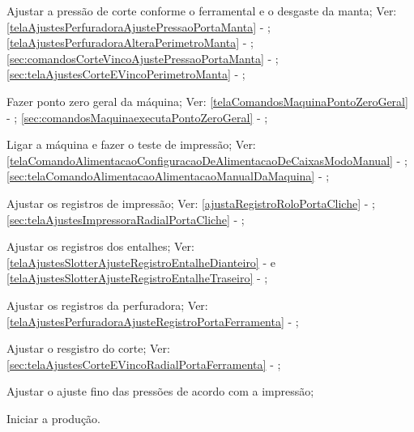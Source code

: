 \begin{procedureAdjustmentNoRecipe}
  \fi
  \item[\ding{\dingNumber}] Ajustar a pressão de corte conforme o ferramental e o desgaste da manta; Ver: 
  \ifmachineTypeFlexo
  \ref{telaAjustesPerfuradoraAjustePressaoPortaManta} - ;
  \ref{telaAjustesPerfuradoraAlteraPerimetroManta} - ;
  \fi
  \ifmachineTypeIcv
  \ref{sec:comandosCorteVincoAjustePressaoPortaManta} - ;
  \ref{sec:telaAjustesCorteEVincoPerimetroManta} - ;
  \fi
  \item[\ding{\dingNumber}] Fazer ponto zero geral da máquina; Ver: 
  \ifmachineTypeFlexo
  \ref{telaComandosMaquinaPontoZeroGeral} - ;
  \fi
  \ifmachineTypeIcv
  \ref{sec:comandosMaquinaexecutaPontoZeroGeral} - ;
  \fi
  \item[\ding{\dingNumber}] Ligar a máquina e fazer o teste de impressão; Ver: 
  \ifmachineTypeFlexo
  \ref{telaComandoAlimentacaoConfiguracaoDeAlimentacaoDeCaixasModoManual} - ;
  \fi
  \ifmachineTypeIcv
  \ref{sec:telaComandoAlimentacaoAlimentacaoManualDaMaquina} - ;
  \fi
  \item[\ding{\dingNumber}] Ajustar os registros de impressão; Ver: 
  \ifmachineTypeFlexo
  \ref{ajustaRegistroRoloPortaCliche} - ;
  \fi
  \ifmachineTypeIcv
  \ref{sec:telaAjustesImpressoraRadialPortaCliche} - ;
  \fi
  \ifmachineTypeFlexo
  \item[\ding{\dingNumber}] Ajustar os registros dos entalhes; Ver: \ref{telaAjustesSlotterAjusteRegistroEntalheDianteiro} -  e \ref{telaAjustesSlotterAjusteRegistroEntalheTraseiro} - ;
  \item[\ding{\dingNumber}] Ajustar os registros da perfuradora; Ver: \ref{telaAjustesPerfuradoraAjusteRegistroPortaFerramenta} - ;
  \fi
  \ifmachineTypeIcv
  \item[\ding{\dingNumber}] Ajustar o resgistro do corte; Ver: \ref{sec:telaAjustesCorteEVincoRadialPortaFerramenta} - ;
  \fi
  \item[\ding{\dingNumber}] Ajustar o ajuste fino das pressões de acordo com a impressão;
  \item[\ding{\dingNumber}] Iniciar a produção.
  
\end{procedureAdjustmentNoRecipe}


